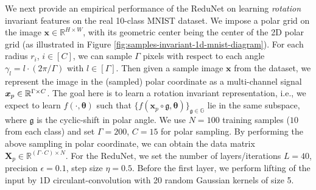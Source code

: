 \documentclass[../../book-main.tex]{subfiles}
\begin{document}
\begin{example}
We next provide an empirical performance of the ReduNet on learning \textit{rotation} invariant features on the real 10-class MNIST dataset. 
We impose a polar grid on the image $\bm{x}\in\mathbb{R}^{H\times W}$, with its geometric center being the center of the 2D polar grid (as illustrated in Figure \ref{fig:samples-invariant-1d-mnist-diagram}). 
For each radius $r_i$, $i \in [C]$, we can sample $\Gamma$ pixels with respect to each angle $\gamma_l =l\cdot({2\pi}/\Gamma)$ with $l \in [\Gamma]$. 
Then given a sample image $\bm{x}$ from the dataset, we represent the image in the (sampled) polar coordinate as a multi-channel signal $\bm{x}_p \in\mathbb{R}^{\Gamma\times C}$.  
The goal here is to learn a rotation invariant representation, i.e., we expect to learn $f(\cdot, \bm{\theta})$ such that $\{f(\bm{x}_p \circ \mathfrak{g}, \bm{\theta})\}_{\mathfrak{g} \in\mathbb{G}}$ lie in the same subspace, where $\mathfrak{g}$ is the cyclic-shift in polar angle.  
We use $N=100$ training samples ($10$ from each class) and set $\Gamma=200$, $C=15$ for polar sampling. 
By performing the above sampling in polar coordinate, we can obtain the data matrix $\bm{X}_p \in \mathbb{R}^{(\Gamma\cdot C) \times N}$. 
For the ReduNet, we set the number of layers/iterations $L=40$, precision $\epsilon=0.1$, step size $\eta=0.5$. Before the first layer, we perform lifting of the input by 1D circulant-convolution with 20 random Gaussian kernels of size 5.   


\end{example}
\end{document}
